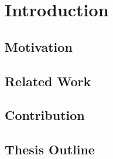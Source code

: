 \chapter{Introduction}\label{introduction}

\section{Motivation}

\section{Related Work}

\section{Contribution}

\section{Thesis Outline}

